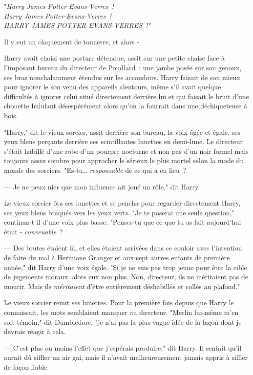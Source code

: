 "\emph{Harry James Potter-Evans-Verres~!\\
Harry James Potter-Evans-Verres~!\\
HARRY JAMES POTTER-EVANS-VERRES~!"}

Il y eut un claquement de tonnerre, et alors -

\later

Harry avait choisi une posture détendue, assit sur une petite chaise face à l'imposant bureau du directeur de Poudlard~: une jambe posée sur son genoux, ses bras nonchalamment étendus sur les accoudoirs. Harry faisait de son mieux pour ignorer le son venu des appareils alentours, même s'il avait quelque difficultés à ignorer celui situé directement derrière lui et qui faisait le bruit d'une chouette hululant désespérément alors qu'on la fourrait dans une déchiqueteuse à bois.

"Harry," dit le vieux sorcier, assit derrière son bureau, la voix âgée et égale, ses yeux bleus perçants derrière ses scintillantes lunettes en demi-lune. Le directeur s'était habillé d'une robe d'un pourpre nocturne et non pas d'un noir formel mais toujours assez sombre pour approcher le sérieux le plus mortel selon la mode du monde des sorciers. "Es-tu… \emph{responsable} de ce qui a eu lieu~?

--- Je ne peux nier que mon influence ait joué un rôle," dit Harry.

Le vieux sorcier ôta ses lunettes et se pencha pour regarder directement Harry, ses yeux bleus braqués vers les yeux verts. "Je te poserai une seule question," continua-t-il d'une voix plus basse. "Penses-tu que ce que tu as fait aujourd'hui était - \emph{convenable}~?

--- Des brutes étaient là, et elles étaient arrivées dans ce couloir avec l'intention de faire du mal à Hermione Granger et aux sept autres enfants de première année," dit Harry d'une voix égale. "Si je ne suis pas trop jeune pour être la cible de jugements moraux, alors eux non plus. Non, directeur, ils ne méritaient pas de mourir. Mais ils \emph{méritaient} d'être entièrement déshabillés et collés au plafond."

Le vieux sorcier remit ses lunettes. Pour la première fois depuis que Harry le connaissait, les mots semblaient manquer au directeur. "Merlin lui-même m'en soit témoin," dit Dumbledore, "je n'ai pas la plus vague idée de la façon dont je devrais réagir à cela.

--- C'est plus ou moins l'effet que j'espérais produire," dit Harry. Il sentait qu'il aurait dû siffler un air gai, mais il n'avait malheureusement jamais appris à siffler de façon fiable.

